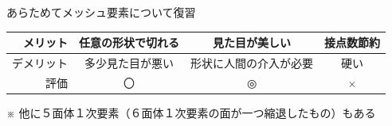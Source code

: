 \begin{frame}{あらためてメッシュ要素について復習}
\begin{table}[hbtp]
\begin{NiceTabular}{|r|c|c|c|}
       \hline
       メリット   & 任意の形状で切れる & 見た目が美しい & 接点数節約 \\
       \hline
       デメリット & 多少見た目が悪い   & 形状に人間の介入が必要 & 硬い \\
       \hline
       評価       &   〇               & ◎              & × \\
       \hline
    \end{NiceTabular}
    ※ 他に５面体１次要素（６面体１次要素の面が一つ縮退したもの）もある
  \end{table}
\end{frame}
